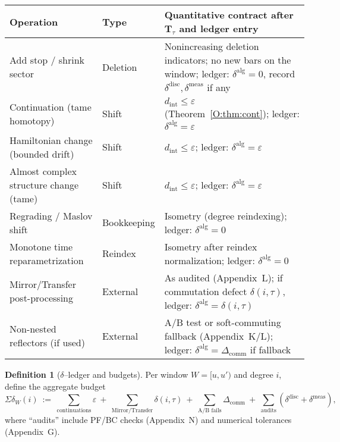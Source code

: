 \documentclass[11pt]{article}
\numberwithin{equation}{section}
\theoremstyle{plain}
\theoremstyle{definition}
\theoremstyle{remark}
\theoremstyle{plain}
\theoremstyle{definition}
\numberwithin{equation}{section}
\theoremstyle{definition}
\newtheorem{definition}[theorem]{Definition}
\numberwithin{equation}{section}
\theoremstyle{plain}
\theoremstyle{definition}
\theoremstyle{remark}
\begin{document}
\begin{center}
\footnotesize
\setlength{\tabcolsep}{4pt}
\renewcommand{\arraystretch}{1.1}
\begin{tabularx}{\linewidth}{@{} L{.26\linewidth} L{.14\linewidth} Y @{}}
\toprule
Operation & Type & Quantitative contract after $\mathbf{T}_\tau$ and ledger entry \\
\midrule
Add stop / shrink sector & Deletion & Nonincreasing deletion indicators; no new bars on the window; ledger: $\delta^{\mathrm{alg}}=0$, record $\delta^{\mathrm{disc}},\delta^{\mathrm{meas}}$ if any \\
Continuation (tame homotopy) & Shift & $d_{\mathrm{int}}\le \varepsilon$ (Theorem~\ref{O:thm:cont}); ledger: $\delta^{\mathrm{alg}}=\varepsilon$ \\
Hamiltonian change (bounded drift) & Shift & $d_{\mathrm{int}}\le \varepsilon$; ledger: $\delta^{\mathrm{alg}}=\varepsilon$ \\
Almost complex structure change (tame) & Shift & $d_{\mathrm{int}}\le \varepsilon$; ledger: $\delta^{\mathrm{alg}}=\varepsilon$ \\
Regrading / Maslov shift & Bookkeeping & Isometry (degree reindexing); ledger: $\delta^{\mathrm{alg}}=0$ \\
Monotone time reparametrization & Reindex & Isometry after reindex normalization; ledger: $\delta^{\mathrm{alg}}=0$ \\
Mirror/Transfer post-processing & External & As audited (Appendix~L); if commutation defect $\delta(i,\tau)$, ledger: $\delta^{\mathrm{alg}}=\delta(i,\tau)$ \\
Non-nested reflectors (if used) & External & A/B test or soft-commuting fallback (Appendix~K/L); ledger: $\delta^{\mathrm{alg}}=\Delta_{\mathrm{comm}}$ if fallback \\
\bottomrule
\end{tabularx}
\end{center}


\begin{definition}[$\delta$–ledger and budgets]\label{O:def:ledger}
Per window \(W=[u,u')\) and degree \(i\), define the aggregate budget
\[
\Sigma\delta_W(i)\ :=\ \sum_{\text{continuations}}\varepsilon\ +\ \sum_{\text{Mirror/Transfer}}\delta(i,\tau)\ +\ \sum_{\text{A/B fails}}\Delta_{\mathrm{comm}}\ +\ \sum_{\text{audits}}(\delta^{\mathrm{disc}}+\delta^{\mathrm{meas}}),
\]
where “audits” include PF/BC checks (Appendix~N) and numerical tolerances (Appendix~G).
\end{definition}
\end{document}
